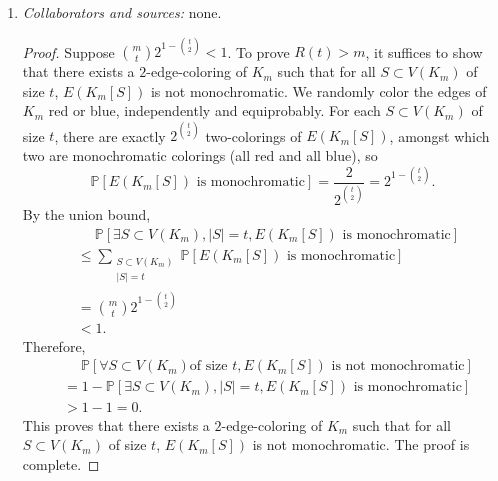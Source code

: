 \documentclass[letterpaper, reqno,11pt]{article}
\newcommand{\PP}{\mathbb{P}}
\begin{document}
\begin{enumerate}
  \clearpage

  \item \noindent\emph{Collaborators and sources:} none.

  \bigskip

  \begin{proof}
    Suppose $\binom{m}{t} 2^{1 - \binom{t}{2}} < 1$. To prove $R(t) > m$, it suffices to show that there exists a $2$-edge-coloring of $K_m$ such that for all $S \subset V(K_m)$ of size $t$, $E(K_m[S])$ is not monochromatic. We randomly color the edges of $K_m$ red or blue, independently and equiprobably. For each $S \subset V(K_m)$ of size $t$, there are exactly $2^{\binom{t}{2}}$ two-colorings of $E(K_m[S])$, amongst which two are monochromatic colorings (all red and all blue), so
    $$ \PP\left[\text{$E\left(K_m[S]\right)$ is monochromatic}\right] = \frac{2}{2^{\binom{t}{2}}} = 2^{1 - \binom{t}{2}}. $$
    By the union bound,
    \begin{align*}
      &\quad \; \PP\left[\exists S \subset V\left(K_m\right), |S| = t, \text{$E\left(K_m[S]\right)$ is monochromatic}\right] \\
      &\leq \sum_{\substack{S \subset V\left(K_m\right) \\ |S| = t}} \PP\left[\text{$E\left(K_m[S]\right)$ is monochromatic}\right] \\
      &= \binom{m}{t} 2^{1 - \binom{t}{2}} \\
      &< 1.
    \end{align*}
    Therefore,
    \begin{align*}
      &\quad\; \PP\left[\forall S \subset V\left(K_m\right) \text{of size $t$}, \text{$E\left(K_m[S]\right)$ is not monochromatic}\right] \\
      &= 1 - \PP\left[\exists S \subset V\left(K_m\right), |S| = t, \text{$E\left(K_m[S]\right)$ is monochromatic}\right] \\
      &> 1 - 1 = 0.
    \end{align*}
    This proves that there exists a $2$-edge-coloring of $K_m$ such that for all $S \subset V(K_m)$ of size $t$, $E(K_m[S])$ is not monochromatic. The proof is complete.
  \end{proof}
\end{enumerate}
\end{document}
